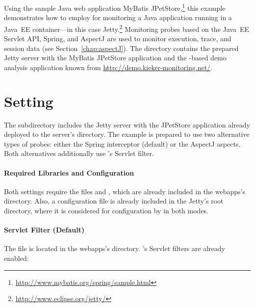 Using the sample Java web application %
MyBatis JPetStore,\footnote{\url{http://www.mybatis.org/spring/sample.html}} this example %
demonstrates how to employ \KiekerMonitoringPart{} for monitoring a Java application %
running in a Java~EE container---in this case Jetty.\footnote{\url{http://www.eclipse.org/jetty/}} %
Monitoring probes based on the Java~EE Servlet API, Spring, %
and AspectJ are used to monitor execution, trace, and session data (see Section~\ref{chap:aspectJ}). %
The directory \dir{\JavaEEServletExampleDistro/} contains the prepared Jetty %
server with the MyBatis JPetStore application and the \Kieker-based demo %
analysis application known from \url{http://demo.kieker-monitoring.net/}. %

\section{Setting}

The subdirectory  includes the %
Jetty server with the JPetStore application already deployed to the server's %
 directory. The example is prepared to use two alternative %
types of \Kieker{} probes: either the \Kieker{} Spring interceptor (default) or the 
\Kieker{} AspectJ aspects. Both alternatives additionally use \Kieker{}'s Servlet 
filter. %

\paragraph{Required Libraries and \KiekerMonitoringPart{} Configuration}

Both settings require the files \file{\aspectJWeaverJar{}} and \file{\mainJar}, %
which are already included in the webapps's  directory. %
Also, a \Kieker{} configuration file is already included in the Jetty's root directory, %
where it is considered for configuration by \KiekerMonitoringPart{} in both modes. 

\paragraph{Servlet Filter (Default)}

The file  is located in the webapps's %
 directory. \Kieker{}'s Servlet filters are already enabled: 

\setXMLListing


